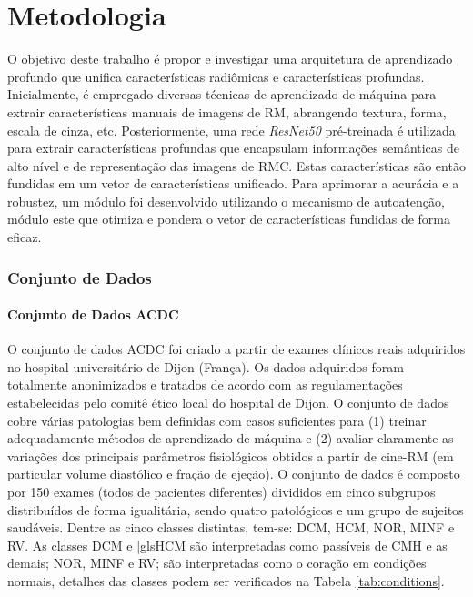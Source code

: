 \chapter{Metodologia} 
\label{chap:metodologia}

O objetivo deste trabalho é propor e investigar uma arquitetura de aprendizado profundo que unifica características radiômicas e características profundas. Inicialmente, é empregado diversas técnicas de aprendizado de máquina para extrair características manuais de imagens de RM, abrangendo textura, forma, escala de cinza, etc. Posteriormente, uma rede \textit{ResNet50} pré-treinada é utilizada para extrair características profundas que encapsulam informações semânticas de alto nível e de representação das imagens de \gls{RMC}. Estas características são então fundidas em um vetor de características unificado. Para aprimorar a acurácia e a robustez, um módulo foi desenvolvido utilizando o mecanismo de autoatenção, módulo este que otimiza e pondera o vetor de características fundidas de forma eficaz.

\subsection{Conjunto de Dados} 
\label{subsec:cap4_dataset}

\subsubsection{Conjunto de Dados ACDC} 
\label{subsec:cap4_acdc}

O conjunto de dados \gls{ACDC} foi criado a partir de exames clínicos reais adquiridos no hospital universitário de Dijon (França). Os dados adquiridos foram totalmente anonimizados e tratados de acordo com as regulamentações estabelecidas pelo comitê ético local do hospital de Dijon. O conjunto de dados cobre várias patologias bem definidas com casos suficientes para (1) treinar adequadamente métodos de aprendizado de máquina e (2) avaliar claramente as variações dos principais parâmetros fisiológicos obtidos a partir de cine-RM (em particular volume diastólico e fração de ejeção). O conjunto de dados é composto por 150 exames (todos de pacientes diferentes) divididos em cinco subgrupos distribuídos de forma igualitária, sendo quatro patológicos e um grupo de sujeitos saudáveis. Dentre as cinco classes distintas, tem-se: \gls{DCM}, \gls{HCM}, \gls{NOR}, \gls{MINF} e \gls{RV}. As classes \gls{DCM} e |gls{HCM} são interpretadas como passíveis de \gls{CMH} e as demais; \gls{NOR}, \gls{MINF} e \gls{RV}; são interpretadas como o coração em condições normais, detalhes das classes podem ser verificados na Tabela \ref{tab:conditions}. 

